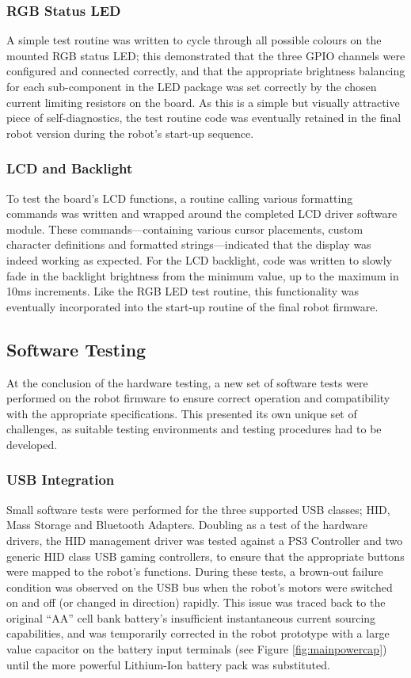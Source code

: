 \subsubsection{RGB Status LED}

A simple test routine was written to cycle through all possible colours on the mounted RGB status LED; this demonstrated that the three GPIO channels were configured and connected correctly, and that the appropriate brightness balancing for each sub-component in the LED package was set correctly by the chosen current limiting resistors on the board. As this is a simple but visually attractive piece of self-diagnostics, the test routine code was eventually retained in the final robot version during the robot's start-up sequence.

\subsubsection{LCD and Backlight}

To test the board's LCD functions, a routine calling various formatting commands was written and wrapped around the completed LCD driver software module. These commands---containing various cursor placements, custom character definitions and formatted strings---indicated that the display was indeed working as expected. For the LCD backlight, code was written to slowly fade in the backlight brightness from the minimum value, up to the maximum in 10ms increments. Like the RGB LED test routine, this functionality was eventually incorporated into the start-up routine of the final robot firmware.

\subsection{Software Testing}

At the conclusion of the hardware testing, a new set of software tests were performed on the robot firmware to ensure correct operation and compatibility with the appropriate specifications. This presented its own unique set of challenges, as suitable testing environments and testing procedures had to be developed.

\subsubsection{USB Integration}

Small software tests were performed for the three supported USB classes; HID, Mass Storage and Bluetooth Adapters. Doubling as a test of the hardware drivers, the HID management driver was tested against a PS3 Controller and two generic HID class USB gaming controllers, to ensure that the appropriate buttons were mapped to the robot's functions. During these tests, a brown-out failure condition was observed on the USB bus when the robot's motors were switched on and off (or changed in direction) rapidly. This issue was traced back to the original ``AA'' cell bank battery's insufficient instantaneous current sourcing capabilities, and was temporarily corrected in the robot prototype with a large value capacitor on the battery input terminals (see Figure \ref{fig:mainpowercap}) until the more powerful Lithium-Ion battery pack was substituted.

